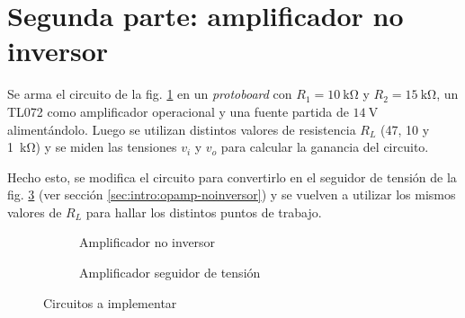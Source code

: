 \section{Segunda parte: amplificador no inversor}

Se arma el circuito de la fig. \ref{fig:2:esquema} en un \textit{protoboard}
con $R_1 = \SI{10}{\kilo\ohm}$ y $R_2 = \SI{15}{\kilo\ohm}$, un TL072 como
amplificador operacional y una fuente partida de $\SI{14}{\volt}$
alimentándolo. Luego se utilizan distintos valores de resistencia $R_L$
(47, 10 y \SI{1}{\kilo\ohm}) y se miden las tensiones $v_i$ y $v_o$ para
calcular la ganancia del circuito.

Hecho esto, se modifica el circuito para convertirlo en el seguidor de tensión
de la fig. \ref{fig:2:esquema-seguidor} (ver sección
\ref{sec:intro:opamp-noinversor}) y se vuelven a utilizar los
mismos valores de $R_L$ para hallar los distintos puntos de trabajo.

\begin{figure}[H]
    \centering
    \begin{subfigure}[b]{0.45\textwidth}
        \centering
        
        \caption{Amplificador no inversor}
        \label{fig:2:esquema}
    \end{subfigure}
    \hfill
    \begin{subfigure}[b]{0.45\textwidth}
        \centering
        
        \caption{Amplificador seguidor de tensión}
        \label{fig:2:esquema-seguidor}
    \end{subfigure}
    \caption{Circuitos a implementar}
\end{figure}




